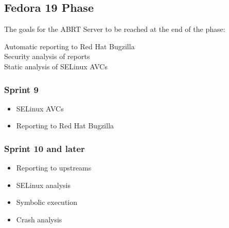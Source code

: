 \documentclass{article}
\begin{document}
\cleardoublepage
\subsection{Fedora 19 Phase}

The goals for the ABRT Server to be reached at the end of the
phase:
\begin{description}
\item[Automatic reporting to Red Hat Bugzilla]
\item[Security analysis of reports]
\item[Static analysis of SELinux AVCs]
\end{description}

\cleardoublepage
\subsubsection{Sprint 9}
\begin{itemize}
\item SELinux AVCs
\item Reporting to Red Hat Bugzilla
\end{itemize}

\cleardoublepage
\subsubsection{Sprint 10 and later}
\begin{itemize}
\item Reporting to upstreams
\item SELinux analysis
\item Symbolic execution
\item Crash analysis
\end{itemize}
\end{document}
